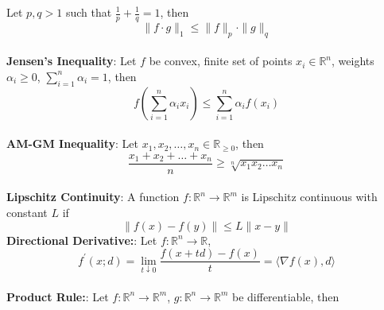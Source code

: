 \begin{theorem}[]{}
    Let $p, q > 1$ such that $\frac{1}{p} + \frac{1}{q} = 1$, then
    \vspace{-5pt}\\
    \begin{equation*}
        \|f \cdot g\|_1 \leq \|f\|_p \cdot \|g\|_q
    \end{equation*}
    \vspace{-5pt}\\
    \textbf{Jensen's Inequality}:
    Let $f$ be convex, finite set of points $x_i \in \mathbb{R}^n$, weights $\alpha_i \geq 0$, $\sum_{i=1}^{n}\alpha_i = 1$, then
    \vspace{-5pt}\\
    \begin{equation*}
        f\left(\sum_{i=1}^{n}\alpha_ix_i\right) \leq \sum_{i=1}^{n}\alpha_if(x_i)
    \end{equation*}
    \vspace{-5pt}\\
    \textbf{AM-GM Inequality}:
    Let $x_1, x_2, \ldots, x_n \in \mathbb{R}_{\geq0}$, then
    \vspace{-5pt}\\
    \begin{equation*}
        \frac{x_1 + x_2 + \ldots + x_n}{n} \geq \sqrt[n]{x_1x_2\ldots x_n}
    \end{equation*}
    \vspace{-5pt}\\
    \textbf{Lipschitz Continuity}:
    A function $f: \mathbb{R}^n \rightarrow \mathbb{R}^m$ is Lipschitz continuous with constant $L$ if
    \vspace{-5pt}\\
    \begin{equation*}
        \|f(x) - f(y)\| \leq L\|x - y\|
    \end{equation*}
    \textbf{Directional Derivative:}:
    Let $f: \mathbb{R}^n \rightarrow \mathbb{R}$,
    \vspace{-4pt}\\
    \begin{equation*}
        f^\prime(x; d) = \lim_{t \downarrow 0} \frac{f(x + td) - f(x)}{t} = \langle \nabla f(x), d \rangle
    \end{equation*}
    \vspace{-4pt}\\
    \textbf{Product Rule:}:
    Let $f: \mathbb{R}^n \rightarrow \mathbb{R}^m$, $g: \mathbb{R}^n \rightarrow \mathbb{R}^m$ be differentiable, then
    \vspace{-4pt}\\

\end{theorem}
